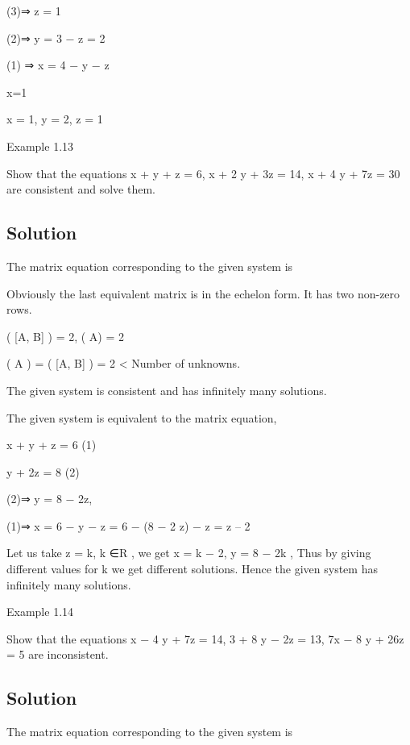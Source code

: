\documentclass[12pt, a4paper]{article}
\begin{document}
(3)⇒ z = 1

(2)⇒ y = 3 − z = 2

(1) ⇒ x = 4 − y − z

x=1

\therefore x = 1, y = 2, z = 1

\newpage 
 

Example 1.13

Show that the equations x + y + z = 6, x + 2 y + 3z = 14, x + 4 y + 7z = 30 are consistent and solve them.

\bigskip \subsection*{Solution}

The matrix equation corresponding to the given system is



Obviously the last equivalent matrix is in the echelon form. It has two non-zero rows.

\therefore \rho ( [A, B] ) = 2, \rho ( A) = 2

\rho ( A ) = \rho ( [A, B] ) = 2 < Number of unknowns.

The given system is consistent and has infinitely many solutions.

The given system is equivalent to the matrix equation,



x + y + z = 6  (1)

y + 2z = 8 (2)

(2)⇒ y = 8 − 2z,

(1)⇒ x = 6 − y − z = 6 − (8 − 2 z) − z = z – 2

Let us take z = k, k ∈R , we get x = k − 2, y = 8 − 2k , Thus by giving different values for k we get different solutions. 
Hence the given system has infinitely many solutions.

 

\newpage 

Example 1.14

Show that the equations x − 4 y + 7z = 14, 3 \times  + 8 y − 2z = 13, 7x − 8 y + 26z = 5 are inconsistent.

\bigskip \subsection*{Solution}

The matrix equation corresponding to the given system is
\end{document}

